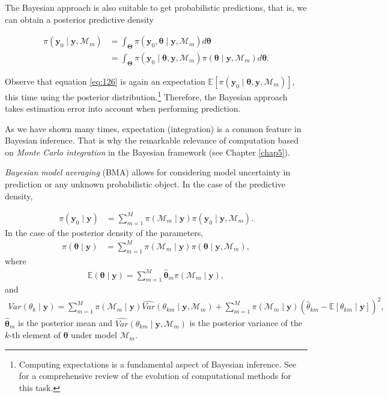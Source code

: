 The Bayesian approach is also suitable to get probabilistic predictions, that is, we can obtain a posterior predictive density 

\begin{align}
	\pi(\mathbf{y}_0\mid \mathbf{y},\mathcal{M}_m) & =\int_{\mathbf{\Theta}}\pi(\mathbf{y}_0,\bm{\theta}\mid \mathbf{y},\mathcal{M}_m)d\bm{\theta}\nonumber\\
	&=\int_{\mathbf{\Theta}}\pi(\mathbf{y}_0\mid \bm{\theta},\mathbf{y},\mathcal{M}_m)\pi(\bm{\theta}\mid \mathbf{y},\mathcal{M}_m)d\bm{\theta}.
	\label{eq:126}
\end{align}

Observe that equation \ref{eq:126} is again an expectation \( \mathbb{E}[\pi(\mathbf{y}_0 \mid \bm{\theta}, \mathbf{y}, \mathcal{M}_m)] \), this time using the posterior distribution.\footnote{Computing expectations is a fundamental aspect of Bayesian inference. See \cite{martin2024computing} for a comprehensive review of the evolution of computational methods for this task.} Therefore, the Bayesian approach takes estimation error into account when performing prediction.

As we have shown many times, expectation (integration) is a common feature in Bayesian inference. That is why the remarkable relevance of computation based on \textit{Monte Carlo integration} in the Bayesian framework (see Chapter \ref{chap5}).

\textit{Bayesian model averaging} (BMA) allows for considering model uncertainty in prediction or any unknown probabilistic object. In the case of the predictive density, 

\begin{align}
	\pi(\mathbf{y}_0\mid \mathbf{y})&=\sum_{m=1}^M \pi(\mathcal{M}_m\mid \mathbf{y})\pi(\mathbf{y}_0\mid \mathbf{y},\mathcal{M}_m).
\end{align}
In the case of the posterior density of the parameters,
\begin{align}
	\pi(\bm{\theta}\mid \mathbf{y})&=\sum_{m=1}^M \pi(\mathcal{M}_m\mid \mathbf{y})\pi(\bm{\theta}\mid \mathbf{y},\mathcal{M}_m),
\end{align}
where 
\begin{align}
	\mathbb{E}(\bm{\theta}\mid \mathbf{y})=\sum_{m=1}^{M}\hat{\bm{\theta}}_m \pi(\mathcal{M}_m\mid \mathbf{y}),
	\label{eq:127}
\end{align}
and
\begin{align}
	Var({\theta}_k\mid \mathbf{y})= \sum_{m=1}^{M}\pi(\mathcal{M}_m\mid \mathbf{y}) \widehat{Var} ({\theta}_{km}\mid \mathbf{y},\mathcal{M}_m)+\sum_{m=1}^{M} \pi(\mathcal{M}_m\mid \mathbf{y}) (\hat{{\theta}}_{km}-\mathbb{E}[{\theta}_{km}\mid \mathbf{y}])^2,
	\label{eq:128}
\end{align}
$\hat{\bm{\theta}}_m$ is the posterior mean and $\widehat{Var}({\theta}_{km}\mid \mathbf{y},\mathcal{M}_m)$ is the posterior variance of the $k$-th element of $\bm{\theta}$ under model $\mathcal{M}_m$.

